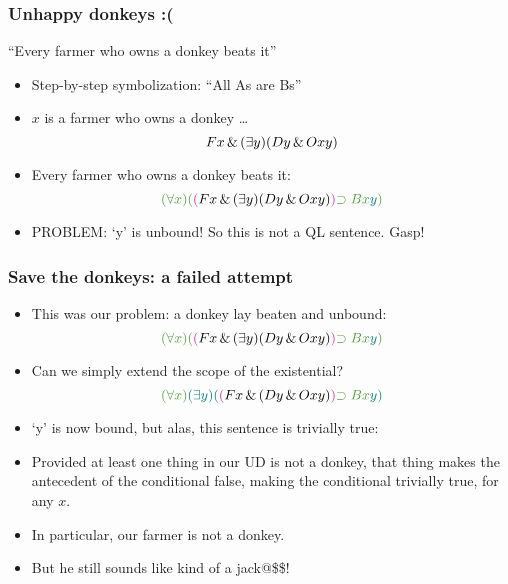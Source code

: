 \begin{frame}
    \frametitle{Unhappy donkeys :( }

``Every farmer who owns a donkey beats it''

\begin{itemize}[<+->]
\item Step-by-step symbolization: ``All As are Bs''
\item $x$ is a farmer who owns a donkey \dots\[
Fx \,\&\, (\exists y)(Dy \,\&\, Oxy)
\]
\item \textcolor{highlightA}{Every} farmer who owns a donkey \textcolor{highlightA}{beats} \textcolor{highlightB}{it}:
\[
\textcolor{highlightA}{\qt{\forall}{x}(}\textcolor{OGlyallpink}{(}F\qv{x} \land \qt{\exists}{y}(D\qv{y} \land O\qr{x}{y})\textcolor{OGlyallpink}{)} \textcolor{highlightA}{\to B\qr{x}{\textcolor{highlightB}{y}})}
\]
\item PROBLEM: `\textcolor{highlightB}{y}' is unbound! So this is not a QL sentence. Gasp! 
\end{itemize}
\end{frame}

\begin{frame}
\frametitle{Save the donkeys: a failed attempt}

\begin{itemize}[<+->]

\item This was our problem: a donkey lay beaten and \textcolor{highlightB}{unbound}:
\[
\textcolor{highlightA}{\qt{\forall}{x}(}\textcolor{OGlyallpink}{(}F\qv{x} \land \qt{\exists}{y}(D\qv{y} \land O\qr{x}{y})\textcolor{OGlyallpink}{)} \textcolor{highlightA}{\to B\qr{x}{\textcolor{highlightB}{y}})}
\]

\item Can we simply extend the scope of the existential? 
\[
\textcolor{highlightA}{\qt{\forall}{x}}\textcolor{highlightB}{\qt{\exists}{y}(}\textcolor{OGlyallpink}{(}F\qv{x} \land (D\qv{y} \land O\qr{x}{y})\textcolor{OGlyallpink}{)} \textcolor{highlightA}{\to B\qr{x}{\textcolor{highlightB}{y)}}}
\]

\item `y' is now bound, but alas, this sentence is trivially true:

\item Provided at least one thing in our UD is not a donkey, that thing makes the antecedent of the conditional false, making the conditional trivially true, for any $x$. 

\item[] In particular, our farmer is not a donkey.
\item[] But he still sounds like kind of a jack@\$\$! 





\end{itemize}
\end{frame}

